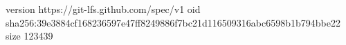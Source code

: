 version https://git-lfs.github.com/spec/v1
oid sha256:39e3884cf168236597e47ff8249886f7bc21d116509316abc6598b1b794bbe22
size 123439
